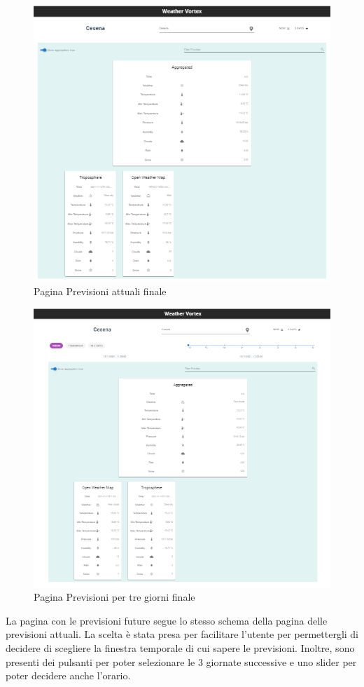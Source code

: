 \begin{figure}[H]
    \caption{Pagina Previsioni attuali finale}
    \label{fig:imForecast1}
    \centering
    \includegraphics[width=1\textwidth]{Images/Forecast3.PNG}
\end{figure}

\begin{figure}[H]
    \caption{Pagina Previsioni per tre giorni finale}
    \label{fig:imForecast2}
    \centering
    \includegraphics[width=1\textwidth]{Images/Forecast3days.PNG}
\end{figure}
La pagina con le previsioni future segue lo stesso schema della pagina delle previsioni attuali. La scelta è stata presa per facilitare l'utente per permettergli di decidere di scegliere la finestra temporale di cui sapere le previsioni. Inoltre, sono presenti dei pulsanti per poter selezionare le 3 giornate successive e uno slider per poter decidere anche l'orario.

